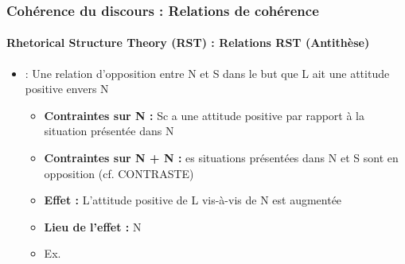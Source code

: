 \documentclass[xcolor=table]{beamer}
\begin{document}
\begin{frame}
	\frametitle{Cohérence du discours : Relations de cohérence}
	\framesubtitle{Rhetorical Structure Theory (RST) : Relations RST (Antithèse)}
	
	\begin{itemize}
		\item {} :  Une relation d'opposition entre N et S dans le but que L ait une attitude positive envers N
		\begin{itemize}
			\item \textbf{Contraintes sur N :} Sc a une attitude positive par rapport à la situation présentée dans N
			\item \textbf{Contraintes sur N + N :} es situations présentées dans N et S sont en opposition (cf. CONTRASTE)
			\item \textbf{Effet :}  L'attitude positive de L vis-à-vis de N est augmentée
			\item \textbf{Lieu de l'effet :} N
			\item Ex. 
		\end{itemize}
	\end{itemize}
	
\end{frame}
\end{document}
